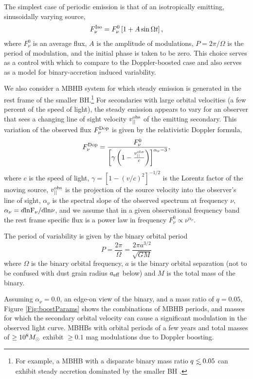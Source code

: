 The simplest case of periodic emission is that of an isotropically emitting, 
sinusoidally varying source,
\begin{equation}
F^{\rm{Iso}}_{\nu} = F^0_{\nu}\left[ 1 + A \sin{\Omega t } \right],
\label{Eq:Fsrc_ISO}
\end{equation}
where $F^0_{\nu}$ is an average flux, $A$ is the amplitude of modulations,
$P=2\pi / \Omega$ is the period of modulation, and the initial phase is taken to
be zero. This choice serves as a control with which to compare to the
Doppler-boosted case and also serves as a model for binary-accretion induced
variability.



We also consider a MBHB system for which steady emission is generated in the
rest frame of the smaller BH.\footnote{For example, a MBHB with a disparate
binary mass ratio $q \lsim0.05$ can exhibit steady accretion dominated by the
smaller BH \citep{Farris:2014}.}  For secondaries with large orbital
velocities (a few percent of the speed of light), the steady emission appears
to vary for an observer that sees a changing line of sight velocity
$v^{\rm{obs}}_{||}$ of the emitting secondary. This variation of the observed
flux $F^{\rm{Dop}}_{\nu}$ is given by the relativistic Doppler formula,
\begin{equation}
F^{\rm{Dop}}_{\nu} = \frac{F^0_{\nu}}{\left[\gamma\left( 1 - \frac{v^{\rm{obs}}_{||}}{c}\right)\right]^{\alpha_{\nu} - 3}},
\label{Eq:Dop1}
\end{equation}
where $c$ is the speed of light, $\gamma = \left[ 1 - (v/c)^2 \right]^{-1/2}$
is the Lorentz factor of the moving source, $v^{\rm{obs}}_{||}$ is the
projection of the source velocity into the observer's line of sight,
$\alpha_{\nu}$ is the spectral slope of the observed spectrum at frequency
$\nu$, $\alpha_{\nu} = d\rm{ln}F_{\nu} / d \rm{ln}\nu$, and we assume that in
a given observational frequency band the rest frame specific flux is a power
law in frequency $F^0_{\nu} \propto \nu^{\alpha_{\nu}}$.

The period of variability is given by the binary orbital period
\begin{equation}
P = \frac{2 \pi}{\Omega} = \frac{2 \pi a^{3/2}}{\sqrt{GM}}
\label{Eq:BPrd}
\end{equation}
where $\Omega$ is the binary orbital frequency, $a$ is the binary orbital
separation (not to be confused with dust grain radius $a_{\rm{eff}}$ below)
and $M$ is the total mass of the binary.


Assuming $\alpha_{\nu}=0.0$, an edge-on view of
the binary, and a mass ratio of $q=0.05$, Figure \ref{Fig:boostParams} shows
the combinations of MBHB periods, and masses for which the secondary orbital
velocity can cause a significant modulation in the observed light curve. MBHBs
with orbital periods of a few years and total masses of $\geq 10^8 {M_{\odot}}$
exhibit $\geq 0.1$ mag modulations due to Doppler boosting.




